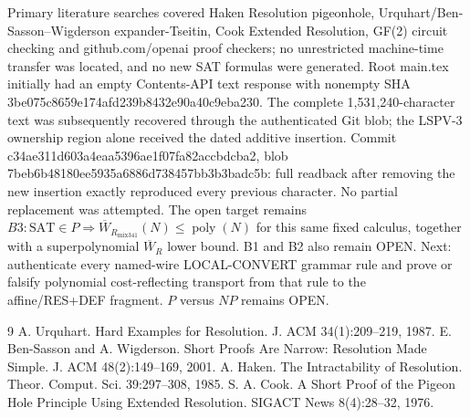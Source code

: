 \documentclass[11pt]{article}
\begin{document}
Primary literature searches covered Haken Resolution pigeonhole, Urquhart/Ben-Sasson--Wigderson expander-Tseitin, Cook Extended Resolution, GF(2) circuit checking and github.com/openai proof checkers; no unrestricted machine-time transfer was located, and no new SAT formulas were generated. Root main.tex initially had an empty Contents-API text response with nonempty SHA 3be075c8659e174afd239b8432e90a40c9eba230. The complete 1,531,240-character text was subsequently recovered through the authenticated Git blob; the LSPV-3 ownership region alone received the dated additive insertion. Commit c34ae311d603a4eaa5396ae1f07fa82accbdcba2, blob 7beb6b48180ee5935a6886d738457bb3b3badc5b: full readback after removing the new insertion exactly reproduced every previous character. No partial replacement was attempted. The open target remains \(B3:\mathrm{SAT}\in P\Rightarrow\overline W_{R_{\mathrm{mix341}}}(N)\le\operatorname{poly}(N)\) for this same fixed calculus, together with a superpolynomial \(\overline W_R\) lower bound. B1 and B2 also remain OPEN. Next: authenticate every named-wire LOCAL-CONVERT grammar rule and prove or falsify polynomial cost-reflecting transport from that rule to the affine/RES+DEF fragment. \(P\) versus \(NP\) remains OPEN.

\begin{thebibliography}{9}
 A. Urquhart. Hard Examples for Resolution. J. ACM 34(1):209--219, 1987.
 E. Ben-Sasson and A. Wigderson. Short Proofs Are Narrow: Resolution Made Simple. J. ACM 48(2):149--169, 2001.
 A. Haken. The Intractability of Resolution. Theor. Comput. Sci. 39:297--308, 1985.
 S. A. Cook. A Short Proof of the Pigeon Hole Principle Using Extended Resolution. SIGACT News 8(4):28--32, 1976.
\end{thebibliography}
\end{document}
